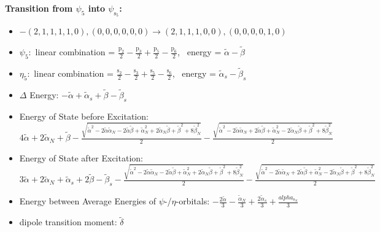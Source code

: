 \documentclass[12pt,a4paper]{article}
\begin{document}
        \noindent\textbf{Transition from $\psi_{5}$ into $\psi_{\text{s}_{5}}$:}
        \begin{itemize}
            \item $- (2, 1, 1, 1, 1, 0), (0, 0, 0, 0, 0, 0) \rightarrow (2, 1, 1, 1, 0, 0), (0, 0, 0, 0, 1, 0)$
        
            \item $\psi_{5}:$ linear combination = $\frac{\text{p}_{2}}{2} - \frac{\text{p}_{3}}{2} + \frac{\text{p}_{5}}{2} - \frac{\text{p}_{6}}{2}$, \
            energy = $\tilde{\alpha} - \tilde{\beta}$
            
            \item $\eta_{5}:$ linear combination = $\frac{\text{s}_{2}}{2} - \frac{\text{s}_{3}}{2} + \frac{\text{s}_{5}}{2} - \frac{\text{s}_{6}}{2}$, \
            energy = $\tilde{\alpha}_{s} - \tilde{\beta}_{s}$
            
                \item $\Delta$ Energy: $- \tilde{\alpha} + \tilde{\alpha}_{s} + \tilde{\beta} - \tilde{\beta}_{s}$
                \item Energy of State before Excitation: $4 \tilde{\alpha} + 2 \tilde{\alpha}_{N} + \tilde{\beta} - \frac{\sqrt{\tilde{\alpha}^{2} - 2 \tilde{\alpha} \tilde{\alpha}_{N} - 2 \tilde{\alpha} \tilde{\beta} + \tilde{\alpha}_{N}^{2} + 2 \tilde{\alpha}_{N} \tilde{\beta} + \tilde{\beta}^{2} + 8 \tilde{\beta}_{N}^{2}}}{2} - \frac{\sqrt{\tilde{\alpha}^{2} - 2 \tilde{\alpha} \tilde{\alpha}_{N} + 2 \tilde{\alpha} \tilde{\beta} + \tilde{\alpha}_{N}^{2} - 2 \tilde{\alpha}_{N} \tilde{\beta} + \tilde{\beta}^{2} + 8 \tilde{\beta}_{N}^{2}}}{2}$
                \item Energy of State after Excitation: $3 \tilde{\alpha} + 2 \tilde{\alpha}_{N} + \tilde{\alpha}_{s} + 2 \tilde{\beta} - \tilde{\beta}_{s} - \frac{\sqrt{\tilde{\alpha}^{2} - 2 \tilde{\alpha} \tilde{\alpha}_{N} - 2 \tilde{\alpha} \tilde{\beta} + \tilde{\alpha}_{N}^{2} + 2 \tilde{\alpha}_{N} \tilde{\beta} + \tilde{\beta}^{2} + 8 \tilde{\beta}_{N}^{2}}}{2} - \frac{\sqrt{\tilde{\alpha}^{2} - 2 \tilde{\alpha} \tilde{\alpha}_{N} + 2 \tilde{\alpha} \tilde{\beta} + \tilde{\alpha}_{N}^{2} - 2 \tilde{\alpha}_{N} \tilde{\beta} + \tilde{\beta}^{2} + 8 \tilde{\beta}_{N}^{2}}}{2}$
                \item Energy between Average Energies of $\psi$-/$\eta$-orbitals: $- \frac{2 \tilde{\alpha}}{3} - \frac{\tilde{\alpha}_{N}}{3} + \frac{2 \tilde{\alpha}_{s}}{3} + \frac{alpha_{\text{s}_N}}{3}$
            
            \item dipole transition moment: $\tilde{\delta}$
        
        \end{itemize}
        
\end{document}
